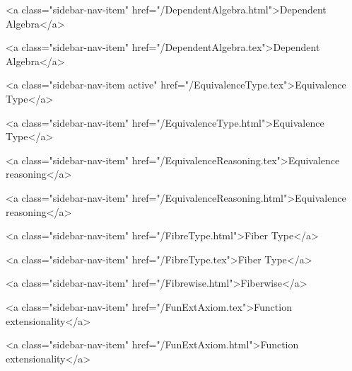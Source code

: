       
    
      
        
          <a class="sidebar-nav-item" href="/DependentAlgebra.html">Dependent Algebra</a>
        
      
    
      
        
          <a class="sidebar-nav-item" href="/DependentAlgebra.tex">Dependent Algebra</a>
        
      
    
      
        
          <a class="sidebar-nav-item active" href="/EquivalenceType.tex">Equivalence Type</a>
        
      
    
      
        
          <a class="sidebar-nav-item" href="/EquivalenceType.html">Equivalence Type</a>
        
      
    
      
        
          <a class="sidebar-nav-item" href="/EquivalenceReasoning.tex">Equivalence reasoning</a>
        
      
    
      
        
          <a class="sidebar-nav-item" href="/EquivalenceReasoning.html">Equivalence reasoning</a>
        
      
    
      
        
          <a class="sidebar-nav-item" href="/FibreType.html">Fiber Type</a>
        
      
    
      
        
          <a class="sidebar-nav-item" href="/FibreType.tex">Fiber Type</a>
        
      
    
      
        
          <a class="sidebar-nav-item" href="/Fibrewise.html">Fiberwise</a>
        
      
    
      
        
          <a class="sidebar-nav-item" href="/FunExtAxiom.tex">Function extensionality</a>
        
      
    
      
        
          <a class="sidebar-nav-item" href="/FunExtAxiom.html">Function extensionality</a>
        
